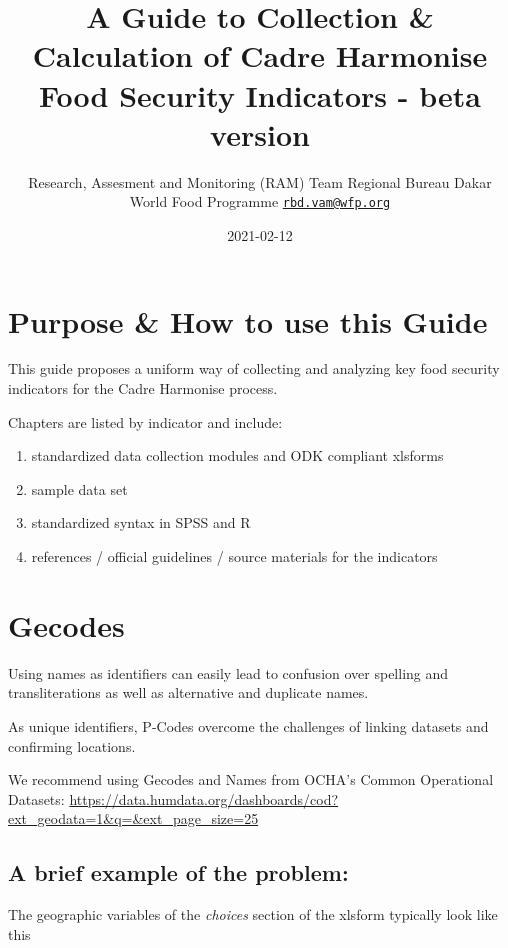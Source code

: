 \documentclass[
]{book}
\title{A Guide to Collection \& Calculation of Cadre Harmonise Food Security Indicators - beta version}
\author{Research, Assesment and Monitoring (RAM) Team Regional Bureau Dakar World Food Programme \href{mailto:rbd.vam@wfp.org}{\nolinkurl{rbd.vam@wfp.org}}}
\date{2021-02-12}
\providecommand{\tightlist}{%
  \setlength{\itemsep}{0pt}\setlength{\parskip}{0pt}}
\begin{document}
\maketitle

{
\setcounter{tocdepth}{1}
\tableofcontents
}
\hypertarget{purpose-how-to-use-this-guide}{%
\chapter{Purpose \& How to use this Guide}\label{purpose-how-to-use-this-guide}}

This guide proposes a uniform way of collecting and analyzing key food security indicators for the Cadre Harmonise process.

Chapters are listed by indicator and include:

\begin{enumerate}
\def\labelenumi{\arabic{enumi}.}
\tightlist
\item
  standardized data collection modules and ODK compliant xlsforms
\item
  sample data set
\item
  standardized syntax in SPSS and R
\item
  references / official guidelines / source materials for the indicators
\end{enumerate}

\hypertarget{gecodes}{%
\chapter{Gecodes}\label{gecodes}}

Using names as identifiers can easily lead to confusion over spelling and transliterations as well as alternative and duplicate names.

As unique identifiers, P-Codes overcome the challenges of linking datasets and confirming locations.

We recommend using Gecodes and Names from OCHA's Common Operational Datasets:
\url{https://data.humdata.org/dashboards/cod?ext_geodata=1\&q=\&ext_page_size=25}

\hypertarget{a-brief-example-of-the-problem}{%
\section{A brief example of the problem:}\label{a-brief-example-of-the-problem}}

The geographic variables of the \emph{choices} section of the xlsform typically look like this
\end{document}
